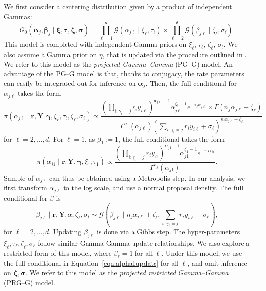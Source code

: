We first consider a centering distribution given by a product of independent Gammas:
\begin{equation*}
    G_0(\bm{\alpha}_j,\bm{\beta}_j\mid \bm{\xi},\bm{\tau},\bm{\zeta},\bm{\sigma}) = \prod_{\ell = 1}^d\mathcal{G}(\alpha_{j\ell}\mid \xi_{\ell},\tau_{\ell})\times\prod_{\ell = 2}^d\mathcal{G}(\beta_{j\ell}\mid\zeta_{\ell},\sigma_{\ell}).
\end{equation*}
This model is completed with independent Gamma priors on $\xi_{\ell}$, $\tau_{\ell}$, $\zeta_{\ell}$, $\sigma_{\ell}$.  We also assume a Gamma prior on $\eta$, that is updated via the procedure outlined in \cite{escobar1995}.  We refer to this model as the \emph{projected Gamma--Gamma} (PG--G) model.  An advantage of the PG--G model is that, thanks to conjugacy, the rate parameters can easily be integrated out for inference on $\bm{\alpha}_j$.  Then, the full conditional for $\alpha_{j\ell}$ takes the form
\begin{equation*}
    \pi(\alpha_{j\ell}\mid \bm{r},\bm{Y},\bm{\gamma},\xi_\ell,\tau_\ell,\zeta_\ell,\sigma_\ell) \propto \frac{\left(\prod_{i:\gamma_i = j}r_iy_{i\ell}\right)^{\alpha_{j\ell} - 1}\alpha_{j\ell}^{\xi_\ell - 1}e^{-\tau_\ell \alpha_{j\ell}}\times\Gamma\left(n_j\alpha_{j\ell} + \zeta_{\ell}\right)}{\Gamma^{n_j}(\alpha_{j\ell})\left(\sum_{i:\gamma_i = j}r_iy_{i\ell} + \sigma_{\ell}\right)^{n_j\alpha_{j\ell} + \zeta_{\ell}}}
\end{equation*}
for $\ell = 2,\ldots,d$.  For $\ell = 1$, as $\beta_{1} := 1$, the full conditional takes the form
\begin{equation}
    \label{eqn:alpha1update}
    \pi(\alpha_{j1}\mid\bm{r},\bm{Y},\bm{\gamma},\xi_1,\tau_1) \propto \frac{\left(\prod_{i:\gamma_i = j}r_iy_{i1}\right)^{\alpha_{j1} - 1}\alpha_{j1}^{\zeta_1 - 1}e^{-\tau_1\alpha_{j1}}}{\Gamma^{n_j}(\alpha_{j1})}.
\end{equation}
Sample of $\alpha_{j\ell}$ can thus be obtained using a Metropolis step. In our analysis, we first transform $\alpha_{j\ell}$ to the log scale, and use a normal proposal density.
The full conditional for $\beta$ is 
\begin{equation}
    \beta_{j\ell}\mid\bm{r},\bm{Y},\alpha,\zeta_{\ell},\sigma_{\ell} \sim \mathcal{G}\left(\beta_{j\ell}\mid n_j\alpha_{j\ell} + \zeta_\ell, \sum_{i:\gamma_i = j}r_iy_{i\ell} + \sigma_{\ell}\right),
\end{equation}
for $\ell = 2,\ldots, d$.  Updating $\beta_{j\ell}$ is done via a Gibbs step.  The hyper-parameters $\xi_{\ell},\tau_{\ell},\zeta_{\ell},\sigma_{\ell}$ follow similar Gamma-Gamma update relationships.  We also explore a restricted form of this model, where $\beta_{\ell} = 1$ for all $\ell$.  Under this model, we use the full conditional in Equation~\ref{eqn:alpha1update} for all $\ell$, and omit inference on $\bm{\zeta},\bm{\sigma}$.  We refer to this model as the \emph{projected restricted Gamma--Gamma} (PRG--G) model.

